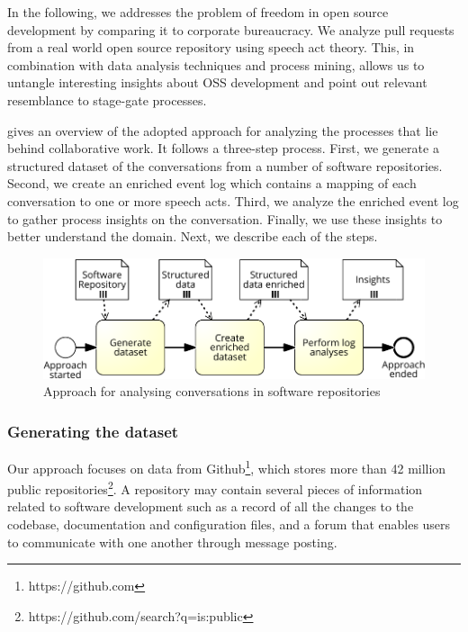 In the following, we addresses the problem of freedom in open source development by comparing it to corporate bureaucracy. We analyze pull requests from a real world open source repository using speech act theory. This, in combination with data analysis techniques and process mining, allows us to untangle interesting insights about OSS development and point out relevant resemblance to stage-gate processes. 

 gives an overview of the adopted approach for analyzing the processes that lie behind collaborative work. It follows a three-step process. First, we generate a structured dataset of the conversations from a number of software repositories. Second, we create an enriched event log which contains a mapping of each conversation to one or more speech acts. Third, we analyze the enriched event log to gather process insights on the conversation. Finally, we use these insights to better understand the domain. Next, we describe each of the steps. 

\begin{figure}
	\centering
	\includegraphics[width=0.8\linewidth]{figures/convesational-approach}
	\caption[Approach for analyzing conversations in software repositories]{Approach for analysing conversations in software repositories}
	\label{fig:conversational-approach}
\end{figure}



%	
%	
%	

\subsubsection{Generating the dataset}

Our approach focuses on data from Github\footnote{https://github.com}, which stores more than 42 million public repositories\footnote{https://github.com/search?q=is:public}. A repository may contain several pieces of information related to software development such as a record of all the changes to the codebase, documentation and configuration files, and a forum that enables users to communicate with one another through message posting. 

